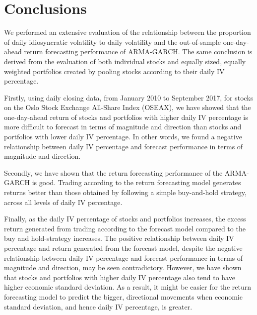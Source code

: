 
\chapter{Conclusions}
\label{Conclusions}

We performed an extensive evaluation of the relationship between the proportion of daily idiosyncratic volatility to daily volatility and the out-of-sample one-day-ahead return forecasting performance of ARMA-GARCH. The same conclusion is derived from the evaluation of both individual stocks and equally sized, equally weighted portfolios created by pooling stocks according to their daily IV percentage. 

Firstly, using daily closing data, from January 2010 to September 2017, for stocks on the Oslo Stock Exchange All-Share Index (OSEAX), we have showed that the one-day-ahead return of stocks and portfolios with higher daily IV percentage is more difficult to forecast in terms of magnitude and direction than stocks and portfolios with lower daily IV percentage. In other words, we found a negative relationship between daily IV percentage and forecast performance in terms of magnitude and direction. 

Secondly, we have shown that the return forecasting performance of the ARMA-GARCH is good. Trading according to the return forecasting model generates returns better than those obtained by following a simple buy-and-hold strategy, across all levels of daily IV percentage. 

Finally, as the  daily IV percentage of stocks and portfolios increases, the excess return generated from trading according to the forecast model compared to the buy and hold-strategy increases. The positive relationship between daily IV percentage and return generated from the forecast model, despite the negative relationship between daily IV percentage and forecast performance in terms of magnitude and direction, may be seen contradictory. However, we have shown that stocks and portfolios with higher daily IV percentage also tend to have higher economic standard deviation. As a result, it might be easier for the return forecasting model to predict the bigger, directional movements when economic standard deviation, and hence daily IV percentage, is greater. 